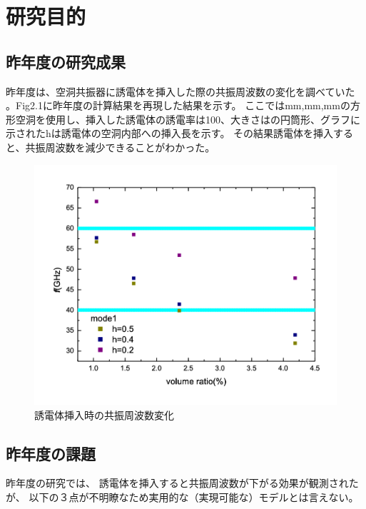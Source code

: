 \chapter{研究目的}

\section{昨年度の研究成果}
昨年度は、空洞共振器に誘電体を挿入した際の共振周波数の変化を調べていた
\cite{わたなべ}。Fig2.1に昨年度の計算結果を再現した結果を示す。
ここではmm,mm,mmの方形空洞を使用し、挿入した誘電体の誘電率は100、大きさはの円筒形、グラフに示されたhは誘電体の空洞内部への挿入長を示す。
その結果誘電体を挿入すると、共振周波数を減少できることがわかった。

\vspace{10 mm}

\begin{figure}[h]
  \begin{center}
    \includegraphics[width=12cm]{./image/watanabe.png}
    \caption{誘電体挿入時の共振周波数変化}
    \label{fig:Watanabe}
  \end{center}
\end{figure}

\section{昨年度の課題}
昨年度の研究\cite{わたなべ}では、
誘電体を挿入すると共振周波数が下がる効果が観測されたが、
以下の３点が不明瞭なため実用的な（実現可能な）モデルとは言えない。


